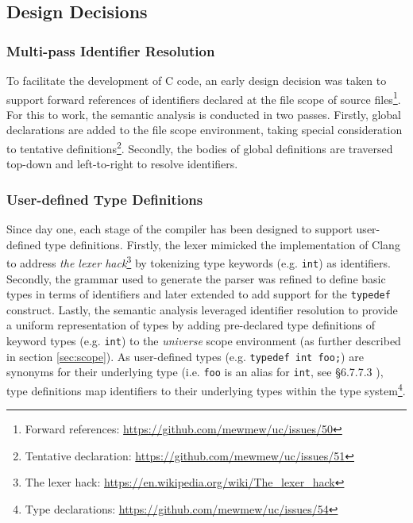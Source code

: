 \subsection{Design Decisions}


\subsubsection{Multi-pass Identifier Resolution}

To facilitate the development of C code, an early design decision was taken to support forward references of identifiers declared at the file scope of source files\footnote{Forward references: \url{https://github.com/mewmew/uc/issues/50}}. For this to work, the semantic analysis is conducted in two passes. Firstly, global declarations are added to the file scope environment, taking special consideration to tentative definitions\footnote{Tentative declaration: \url{https://github.com/mewmew/uc/issues/51}}. Secondly, the bodies of global definitions are traversed top-down and left-to-right to resolve identifiers.

\subsubsection{User-defined Type Definitions}

Since day one, each stage of the compiler has been designed to support user-defined type definitions. Firstly, the lexer mimicked the implementation of Clang to address \textit{the lexer hack}\footnote{The lexer hack: \url{https://en.wikipedia.org/wiki/The_lexer_hack}} by tokenizing type keywords (e.g. \texttt{int}) as identifiers. Secondly, the grammar used to generate the parser was refined to define basic types in terms of identifiers and later extended to add support for the \texttt{typedef} construct. Lastly, the semantic analysis leveraged identifier resolution to provide a uniform representation of types by adding pre-declared type definitions of keyword types (e.g. \texttt{int}) to the \textit{universe} scope environment (as further described in section \ref{sec:scope}). As user-defined types (e.g. \texttt{typedef int foo;}) are synonyms for their underlying type (i.e. \texttt{foo} is an alias for \texttt{int}, see §6.7.7.3 \cite{c11_spec}), type definitions map identifiers to their underlying types within the type system\footnote{Type declarations: \url{https://github.com/mewmew/uc/issues/54}}.

